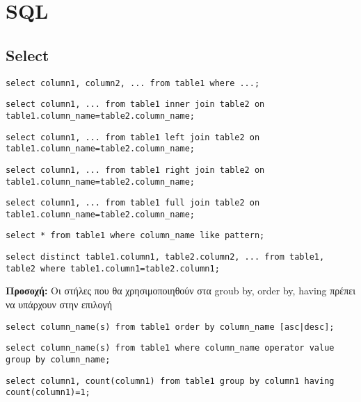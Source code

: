 \section{SQL}

\subsection{Select}

\lstset{language=SQL}

\begin{lstlisting}[caption=select example]
select column1, column2, ... from table1 where ...; 
\end{lstlisting}

\begin{lstlisting}[caption=inner join example]
select column1, ... from table1 inner join table2 on table1.column_name=table2.column_name;
\end{lstlisting}

\begin{lstlisting}[caption=left join example]
select column1, ... from table1 left join table2 on table1.column_name=table2.column_name;
\end{lstlisting}

\begin{lstlisting}[caption=right join example]
select column1, ... from table1 right join table2 on table1.column_name=table2.column_name;
\end{lstlisting}

\begin{lstlisting}[caption=full join example]
select column1, ... from table1 full join table2 on table1.column_name=table2.column_name;
\end{lstlisting}

\begin{lstlisting}[caption=like example]
select * from table1 where column_name like pattern;
\end{lstlisting}

\begin{lstlisting}[caption=distinct example]
select distinct table1.column1, table2.column2, ... from table1, table2 where table1.column1=table2.column1;
\end{lstlisting}

\textbf{Προσοχή:} Oι στήλες που θα χρησιμοποιηθούν στα groub by, order by, having πρέπει να υπάρχουν στην επιλογή

\begin{lstlisting}[caption=order by example]
select column_name(s) from table1 order by column_name [asc|desc];
\end{lstlisting}

\begin{lstlisting}[caption=group by example]
select column_name(s) from table1 where column_name operator value group by column_name;
\end{lstlisting}

\begin{lstlisting}[caption=having example]
select column1, count(column1) from table1 group by column1 having count(column1)=1;
\end{lstlisting}

